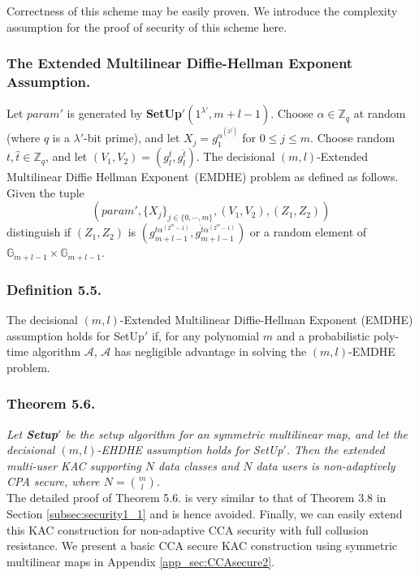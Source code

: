 \noindent Correctness of this scheme may be easily proven. We introduce the complexity assumption for the proof of security of this scheme here.

\subsubsection{The Extended Multilinear Diffie-Hellman Exponent Assumption.} Let $param'$ is generated by \textbf{SetUp}$'(1^{\lambda'},m+l-1)$. Choose $\alpha \in \mathbb{Z}_q$ at random (where $q$ is a $\lambda'$-bit prime), and let $X_j=g^{\alpha^{(2^j)}}_{1}$ for $0\leq j \leq m$. Choose random $t,\hat{t}\in\mathbb{Z}_q$, and let $(V_1,V_2)=\left(g^{t}_{l},g^{\hat{t}}_{l}\right)$. The decisional $(m,l)$-Extended Multilinear Diffie Hellman Exponent~(EMDHE) problem as defined as follows. Given the tuple 
\begin{equation}
\left(param',\{X_j\}_{j\in\{0,\cdots,m\}},(V_1,V_2),(Z_1,Z_2)\right)\nonumber
\end{equation}
\noindent distinguish if $(Z_1,Z_2)$ is $\left(g^{t\alpha^{(2^m-1)}}_{m+l-1},g^{\hat{t}\alpha^{(2^m-1)}}_{m+l-1}\right)$ or a random element of $\mathbb{G}_{m+l-1}\times\mathbb{G}_{m+l-1}$.

\subsubsection{Definition 5.5.} The decisional $(m,l)$-Extended Multilinear Diffie-Hellman Exponent (EMDHE) assumption holds for {SetUp}$'$ if, for any polynomial $m$ and a probabilistic poly-time algorithm $\mathcal{A}$, $\mathcal{A}$ has negligible advantage in solving the $(m,l)$-EMDHE problem.

\subsubsection{Theorem 5.6.} \textit{Let \textbf{Setup}$'$ be the setup algorithm for an symmetric multilinear map, and let the decisional $(m,l)$-EHDHE assumption holds for {SetUp}$'$. Then the extended multi-user KAC supporting $N$ data classes and $N$ data users is non-adaptively CPA secure, where $N=\binom{m}{l}$.}\\

\noindent The detailed proof of Theorem 5.6. is very similar to that of Theorem 3.8 in Section \ref{subsec:security1_1} and is hence avoided. Finally, we can easily extend this KAC construction for non-adaptive CCA security with full collusion resistance. We present a basic CCA secure KAC construction using symmetric multilinear maps in Appendix \ref{app_sec:CCAsecure2}.












